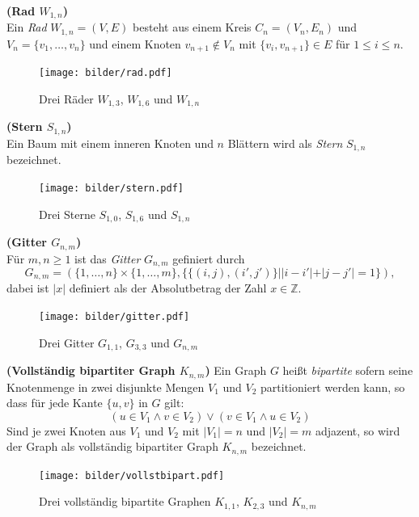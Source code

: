 \begin{defi}{\textbf{(Rad $W_{1,n}$)}}\\
Ein \emph{Rad} $W_{1,n}=(V,E)$ besteht aus einem Kreis $C_n=(V_n,E_n)$ und $V_n=\{v_1, \ldots ,v_n\}$ und einem Knoten $v_{n+1} \notin V_n$ mit $\{v_i, v_{n+1} \} \in E$ für $1 \leq i \leq n$. 
\end{defi}
\vspace{-2mm}
\begin{figure}[h!]
		\centering 		 
   \texttt{[image: bilder/rad.pdf]}
	\caption{Drei Räder $W_{1,3}$, $W_{1,6}$ und $W_{1,n}$}
  	 \end{figure}
\begin{defi}{\textbf{(Stern $S_{1,n}$)}}\\
\label{defstern}
Ein Baum mit einem inneren Knoten und $n$ Blättern wird als \emph{Stern} $S_{1,n}$ bezeichnet. \end{defi}
\vspace{-2mm}
\begin{figure}[h!]
		\centering 		 
   \texttt{[image: bilder/stern.pdf]}
	\caption{Drei Sterne $S_{1,0}$, $S_{1,6}$ und $S_{1,n}$}
  	 \end{figure}

\begin{defi}{\textbf{(Gitter $G_{n,m}$)}}\\
Für $m,n \geq 1$ ist das \emph{Gitter} $G_{n,m}$ gefiniert durch $$G_{n,m}=(\{1,\ldots,n\}\times\{1,\ldots ,m\},\{\{(i,j),(i',j')\}||i-i'|+|j-j'|=1\} ),$$ dabei ist $|x|$ definiert als der Absolutbetrag der Zahl $x \in \mathbb{Z}$.\cite{exaktealgorithmenfuerschweregraphenprobleme} 
\end{defi}
\vspace{-4mm}
\begin{figure}[h!]
		\centering 		 
   \texttt{[image: bilder/gitter.pdf]}
	\caption{Drei Gitter $G_{1,1}$, $G_{3,3}$ und $G_{n,m}$}
  	 \end{figure}

\begin{defi}{\textbf{(Vollständig bipartiter Graph $K_{n,m}$)}}\newline
Ein Graph $G$ heißt \emph{bipartite} sofern seine Knotenmenge in zwei disjunkte Mengen $V_1$ und $V_2$ partitioniert werden kann, so dass für jede Kante $\{u,v\}$ in $G$ gilt: $$(u \in V_1 \wedge v \in V_2)\vee (v \in V_1 \wedge u \in V_2)$$Sind je zwei Knoten aus $V_1$ und $V_2$ mit $|V_1|=n$ und $|V_2|=m$ adjazent, so wird der Graph als vollständig bipartiter Graph $K_{n,m}$ bezeichnet. \end{defi}
\begin{figure}[h!]
		\centering 		 
   \texttt{[image: bilder/vollstbipart.pdf]}
	\caption{Drei vollständig bipartite Graphen $K_{1,1}$, $K_{2,3}$ und $K_{n,m}$}
  	 \end{figure}



